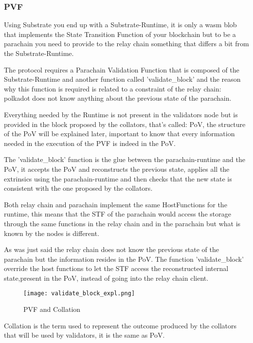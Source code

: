 \documentclass[../main.tex]{subfiles}
\begin{document}
\subsubsection{PVF}

Using Substrate you end up with a Substrate-Runtime, it is only a wasm blob that implements the State Transition Function of your blockchain but to be a parachain you need to provide to the relay chain something that differs a bit from the Substrate-Runtime.

The protocol requires a Parachain Validation Function that is composed of the Substrate-Runtime and another function called 'validate\_block' and the reason why this function is required is related to a constraint of the relay chain: polkadot does not know anything about the previous state of the parachain.

Everything needed by the Runtime is not present in the validators node but is provided in the block proposed by the collators, that's called: PoV, the structure of the PoV will be explained later, important to know that every information needed in the execution of the PVF is indeed in the PoV.

The 'validate\_block' function is the glue between the parachain-runtime and the PoV, it accepts the PoV and reconstructs the previous state, applies all the extrinsics using the parachain-runtime and then checks that the new state is consistent with the one proposed by the collators.

Both relay chain and parachain implement the same HostFunctions for the runtime, this means that the STF of the parachain would access the storage through the same functions in the relay chain and in the parachain but what is known by the nodes is different.

As was just said the relay chain does not know the previous state of the parachain but the information resides in the PoV. The function 'validate\_block' override the host functions to let the STF access the reconstructed internal state,present in the PoV, instead of going into the relay chain client.

\begin{figure}[h]
  \centering
  \texttt{[image: validate\_block\_expl.png]}
  \caption{PVF and Collation}
  \label{fig:pvf_pov}
\end{figure}

Collation is the term used to represent the outcome produced by the collators that will be used by validators, it is the same as PoV.
\end{document}
